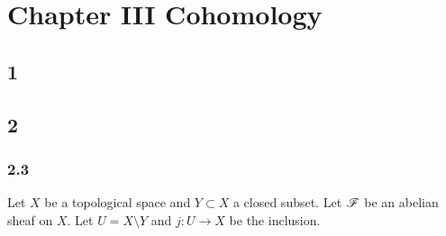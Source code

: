 \documentclass[12pt]{article}
\begin{document}
\section{Chapter III Cohomology}

\subsection{1}


\subsection{2}

\subsubsection{2.3}

Let $X$ be a topological space and $Y \subset X$ a closed subset. Let $\mathscr{F}$ be an abelian sheaf on $X$. Let $U = X \setminus Y$ and $j : U \to X$ be the inclusion.
\end{document}
